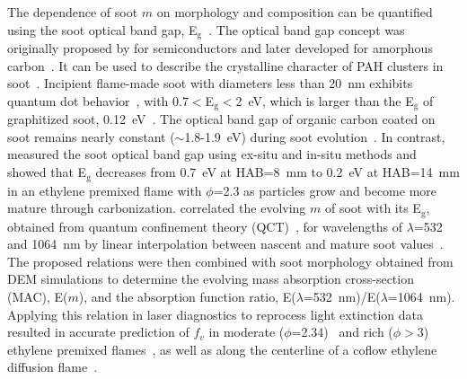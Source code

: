 The dependence of soot $m$ on morphology and composition can be quantified using the soot optical band gap, E$_\mathrm{g}$~\citep{bond2006light}. The optical band gap concept was originally proposed by \citet{tauc1966optical} for semiconductors and later developed for amorphous carbon~\citep{robertson1987electronic}. It can be used to describe the crystalline character of PAH clusters in soot~\citep{robertson1987electronic}. Incipient flame-made soot with diameters less than 20~nm exhibits quantum dot behavior~\citep{liu2019flame}, with 0.7$<$E$_\mathrm{g}$$<$2~eV, which is larger than the E$_\mathrm{g}$ of graphitized soot, 0.12~eV~\citep{liu2019flame}. The optical band gap of organic carbon coated on soot remains nearly constant ($\sim$1.8-1.9~eV) during soot evolution~\citep{le2019soot}. In contrast, \citet{russo2020optical} measured the soot optical band gap using ex-situ and in-situ methods and showed that E$_\mathrm{g}$ decreases from 0.7~eV at HAB=8~mm to 0.2~eV at HAB=14~mm in an ethylene premixed flame with $\phi$=2.3 as particles grow and become more mature through carbonization. \citet{kelesidis2019soot} correlated the evolving $m$ of soot with its E$_\mathrm{g}$, obtained from quantum confinement theory (QCT)~\citep{liu2019flame}, for wavelengths of $\lambda$=532 and 1064~nm by linear interpolation between nascent and mature soot values~\citep{kelesidis2019soot}. The proposed relations were then combined with soot morphology obtained from DEM simulations to determine the evolving mass absorption cross-section (MAC), E($m$), and the absorption function ratio, E($\lambda$=532~nm)/E($\lambda$=1064~nm). Applying this relation in laser diagnostics to reprocess light extinction data resulted in accurate prediction of $f_v$ in moderate ($\phi$=2.34)~\citep{kelesidis2021determination} and rich ($\phi>$3) ethylene premixed flames~\citep{mei2021formation}, as well as along the centerline of a coflow ethylene diffusion flame~\citep{kelesidis2022santoro}.

